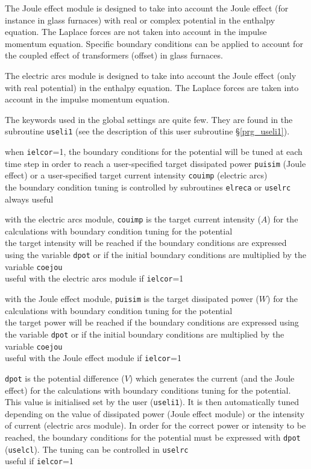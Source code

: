 The Joule effect module is designed to take into account the Joule effect
(for instance in glass furnaces) with real or complex potential in the
enthalpy equation. The Laplace forces are not taken into account in the
impulse momentum equation. Specific boundary conditions can be applied to
account for the coupled effect of transformers (offset) in glass furnaces.

The electric arcs module is designed to take into account the Joule effect
(only with real potential) in the enthalpy equation. The Laplace forces
are taken into account in the impulse momentum equation.

The keywords used in the global settings are quite few. They are
found in the subroutine \texttt{useli1} (see the description of this
user subroutine \S\ref{prg_useli1}).

{when \texttt{ielcor}=1, the boundary conditions for the potential will be
tuned at each time step in order to reach a user-specified target dissipated
power \texttt{puisim} (Joule effect) or a user-specified target current
intensity \texttt{couimp} (electric arcs)\\
the boundary condition tuning is controlled by subroutines \texttt{elreca} or
\texttt{uselrc}\\
always useful}

{with the electric arcs module, \texttt{couimp} is the target current intensity ($A$)
for the calculations with boundary condition tuning for the potential\\
the target intensity will be reached if the boundary conditions are expressed
using the variable \texttt{dpot} or if the initial boundary conditions are multiplied by
the variable \texttt{coejou}\\
useful with the electric arcs module if \texttt{ielcor}=1}

{with the Joule effect module, \texttt{puisim} is the target dissipated power ($W$)
for the calculations with boundary condition tuning for the potential\\
the target power will be reached if the boundary conditions are expressed
using the variable \texttt{dpot} or if the initial boundary conditions are multiplied by
the variable \texttt{coejou}\\
useful with the Joule effect module if \texttt{ielcor}=1}

{\texttt{dpot} is the potential difference ($V$) which generates the current (and the Joule effect) for the
calculations with boundary conditions tuning for the potential. This value is
initialised set by the user (\texttt{useli1}). It is then automatically tuned
depending on the value of dissipated power (Joule effect module) or the
intensity of current (electric arcs module).
In order for the correct power or intensity to be reached, the boundary
conditions for the potential must be expressed with \texttt{dpot}
(\texttt{uselcl}). The tuning can be controlled in \texttt{uselrc}\\
useful if \texttt{ielcor}=1}

